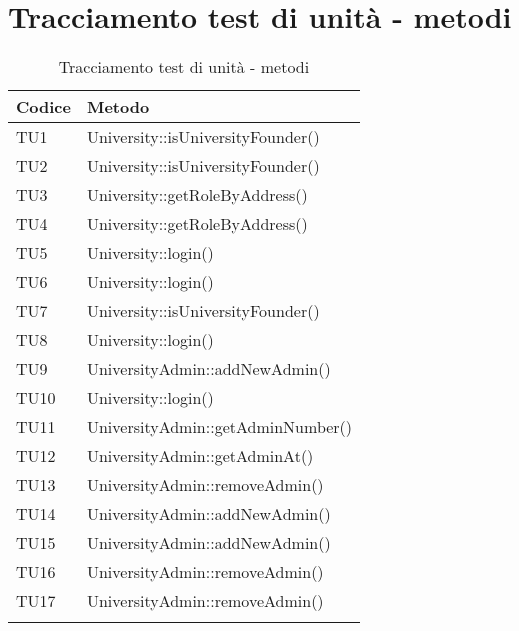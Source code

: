 \documentclass[PianoDiQualifica.tex]{subfiles}
\begin{document}
\section{Tracciamento test di unità - metodi}
\begin{longtable}[H]{P{5cm}P{8.5cm}}
	\color{CHeaderText}\textbf{Codice} & 
	\color{CHeaderText}\textbf{Metodo} \\
	\endhead
	TU1 & University::isUniversityFounder() \\ 
	TU2 & University::isUniversityFounder() \\
	TU3 & University::getRoleByAddress() \\
	TU4 & University::getRoleByAddress() \\
	TU5 & University::login() \\
	TU6 & University::login() \\
	TU7 & University::isUniversityFounder() \\
	TU8 & University::login() \\
	TU9 & UniversityAdmin::addNewAdmin() \\
	TU10 & University::login() \\
	TU11 & UniversityAdmin::getAdminNumber() \\
	TU12 & UniversityAdmin::getAdminAt() \\
	TU13 & UniversityAdmin::removeAdmin() \\
	TU14 & UniversityAdmin::addNewAdmin() \\
	TU15 & UniversityAdmin::addNewAdmin() \\
	TU16 & UniversityAdmin::removeAdmin() \\
	TU17 & UniversityAdmin::removeAdmin() \\
	\hiderowcolors
	\caption{Tracciamento test di unità - metodi}
\end{longtable}
	
\end{document}
